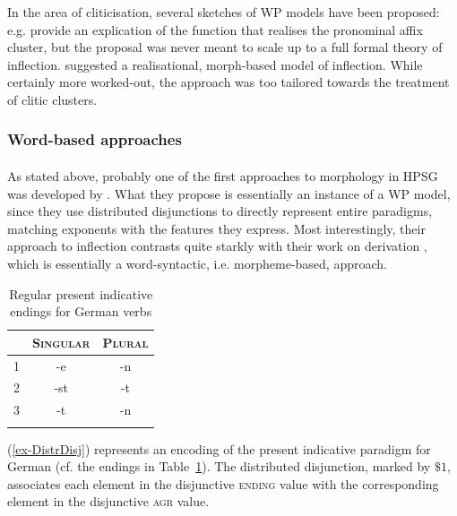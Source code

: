 \documentclass[output=paper
	        ,collection
	        ,collectionchapter
 	        ,biblatex
                ,babelshorthands
                ,newtxmath
                ,draftmode
                ,colorlinks, citecolor=brown
]{langscibook}
\begin{document}
In the area of cliticisation, several sketches of WP models have been
proposed: e.g. \citet{Miller97} provide an explication of the function
that realises the pronominal affix cluster, but the proposal was never
meant to scale up to a full formal theory of
inflection. \citet{crysmann_b03book} suggested a realisational,
morph-based model of inflection. While certainly more worked-out, the
approach was too tailored towards the treatment of clitic
clusters. 



\subsubsection{Word-based approaches}

\paragraph*{\citet{Krieger:Nerbonne:93}}
As stated above, probably one of the first approach\-es to morphology
in HPSG was developed by \citet{Krieger:Nerbonne:93}. What they
propose is essentially an instance of a WP model, since they use
distributed disjunctions to directly represent entire paradigms,
matching exponents with the features they express. Most interestingly,
their approach to inflection contrasts quite starkly with their
work on derivation \citep{Krieger:Nerbonne:93}, which is essentially a
word-syntactic, i.e. morpheme-based, approach.


\begin{table}[htb]
  \centering
  \begin{tabular}{r|cc}
    \lsptoprule
    & \textsc{Singular} & \textsc{Plural}\\
    \midrule
    1 & -e & -n\\
    2 & -st & -t\\
    3 & -t & -n\\
    \lspbottomrule
  \end{tabular}
  \caption{Regular present indicative endings for  German verbs}
  \label{tab:GermanEndings}
\end{table}

(\ref{ex-DistrDisj}) represents an encoding of the present
indicative paradigm for German (cf. the endings in Table~\ref{tab:GermanEndings}). The distributed disjunction, marked by ${\$
  1}$, associates each element in the disjunctive \textsc{ending}
value with the corresponding element in the disjunctive \textsc{agr}
value.  
\end{document}
